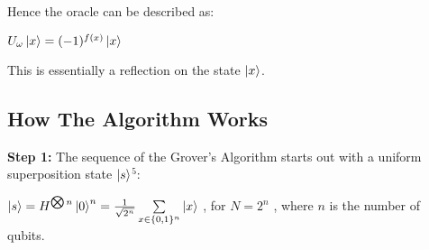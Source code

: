 \documentclass{article}
\begin{document}
Hence the oracle can be described as:
\vspace{5mm}

\qquad $U_\omega\ket{x} = (-1)^{f(x)} \ket{x}$
\vspace{5mm}

This is essentially a reflection on the state $\ket{x}$.

\pagebreak

\subsection{How The Algorithm Works}
\vspace{5mm}

\textbf{Step 1:}
\vspace{5mm}
\noindent
The sequence of the Grover's Algorithm starts out with a uniform superposition state $\ket{s}$\hyperlink{5}{$^5$}:
\vspace{5mm}

\qquad $ \ket{s}= H^{\bigotimes n} \ket{0}^n = \frac{1}{\sqrt{2^n}}\sum\limits_{x \in \{0,1\}^n}\ket{x} $ , \qquad for $N = 2^n$ , where $n$ is the number of qubits.
\vspace{5mm}
\end{document}
